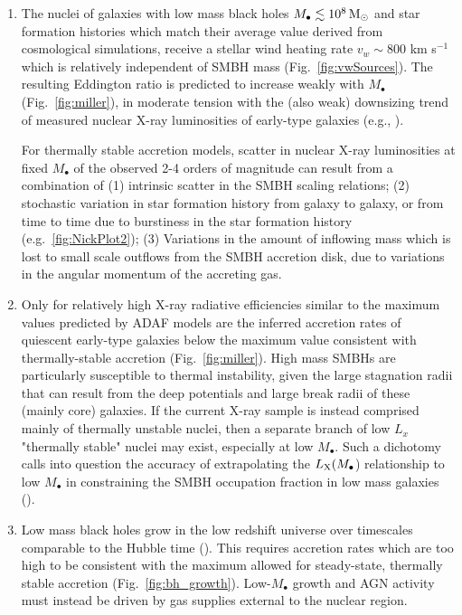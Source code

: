 \documentclass[usenatbib,fleqn]{mn2e}
\newcommand{\Mdot}{\dot{M}}
\newcommand{\rs}{r_s}
\newcommand{\rb}{r_b}
\newcommand{\Mbh}[1][]{M_{\bullet#1}}
\begin{document}
\begin{enumerate}
\item The nuclei of galaxies with low mass black holes $\Mbh \lesssim 10^8
  \Msun$ and star formation histories which match their average value derived from cosmological simulations, receive a stellar wind heating rate $v_w\sim 800$ km s$^{-1}$ which is relatively independent of SMBH mass (Fig.~\ref{fig:vwSources}).  The resulting Eddington ratio is predicted to increase weakly with $M_{\bullet}$ (Fig.~\ref{fig:miller}), in moderate tension with the (also weak) downsizing trend of measured nuclear X-ray luminosities of early-type galaxies (e.g., \citealt{Miller+15}).  

For thermally stable accretion models, scatter in nuclear X-ray luminosities at fixed $\Mbh$ of the observed 2-4 orders of magnitude can result from a combination of (1) intrinsic scatter in the SMBH scaling relations; (2) stochastic variation in star formation history from galaxy to galaxy, or from time to time due to burstiness in the star formation history (e.g.~\ref{fig:NickPlot2}); (3) Variations in the amount of inflowing mass which is lost to small scale outflows from the SMBH accretion disk, due to variations in the angular momentum of the accreting gas.

\item Only for relatively high X-ray radiative efficiencies similar to the maximum values predicted by ADAF models are the inferred accretion rates of quiescent early-type galaxies below the maximum value consistent with thermally-stable accretion (Fig.~\ref{fig:miller}).  High mass SMBHs are particularly susceptible to thermal instability, given the large stagnation radii that can result from the deep potentials and large break radii of these (mainly core) galaxies.  If the current X-ray sample is instead comprised mainly of thermally unstable nuclei, then a separate branch of low $L_x$ "thermally stable" nuclei may exist, especially at low $M_{\bullet}$.  Such a dichotomy calls into question the accuracy of extrapolating the $L_{\rm X}(M_{\bullet}$) relationship to low $M_{\bullet}$ in constraining the SMBH occupation fraction in low mass galaxies (\citealt{Miller+15}).

  \item Low mass black holes grow in the low redshift universe over timescales comparable to the Hubble time (\citet{Heckman+04}).  This requires accretion rates which are too high to be consistent with the maximum allowed for steady-state, thermally stable accretion (Fig.~\ref{fig:bh_growth}).  Low-$M_{\bullet}$ growth and AGN activity must instead be driven by gas supplies external to the nuclear region.  

    

\end{enumerate}
   
\end{document}
